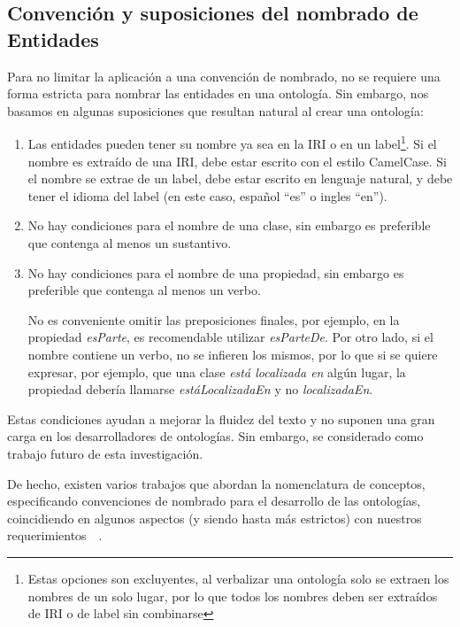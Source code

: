 \subsection{Convención y suposiciones del nombrado de Entidades}
Para no limitar la aplicación a una convención de nombrado, no se requiere una forma estricta para nombrar las entidades en una ontología. Sin embargo, nos basamos en algunas suposiciones que resultan natural al crear una ontología:
\begin{enumerate}
    \item Las entidades pueden tener su nombre ya sea en la IRI o en un label\footnote{Estas opciones son excluyentes, al verbalizar una ontología solo se extraen los nombres de un solo lugar, por lo que todos los nombres deben ser extraídos de IRI o de label sin combinarse}. Si el nombre es extraído de una IRI, debe estar escrito con el estilo CamelCase. Si el nombre se extrae de un label, debe estar escrito en lenguaje natural, y debe tener el idioma del label (en este caso, español ``es'' o ingles ``en'').
    \item No hay condiciones para el nombre de una clase, sin embargo es preferible que contenga al menos un sustantivo.
    \item No hay condiciones para el nombre de una propiedad, sin embargo es preferible que contenga al menos un verbo. 
    
    No es conveniente omitir las preposiciones finales, por ejemplo, en la propiedad \emph{esParte}, es recomendable utilizar \emph{esParteDe}. Por otro lado, si el nombre contiene un verbo, no se infieren los mismos, por lo que si se quiere expresar, por ejemplo, que una clase \emph{está localizada en} algún lugar, la propiedad debería llamarse \emph{estáLocalizadaEn} y no \emph{localizadaEn}. 
    
\end{enumerate}

Estas condiciones ayudan a mejorar la fluidez del texto y no suponen una gran carga en los desarrolladores de ontologías. Sin embargo, se considerado como trabajo futuro de esta investigación.

De hecho, existen varios trabajos que abordan la nomenclatura de conceptos, especificando convenciones de nombrado para el desarrollo de las ontologías, coincidiendo en algunos aspectos (y siendo hasta más estrictos) con nuestros requerimientos~\cite{montiel2011style}~\cite{OntoCheck}.

